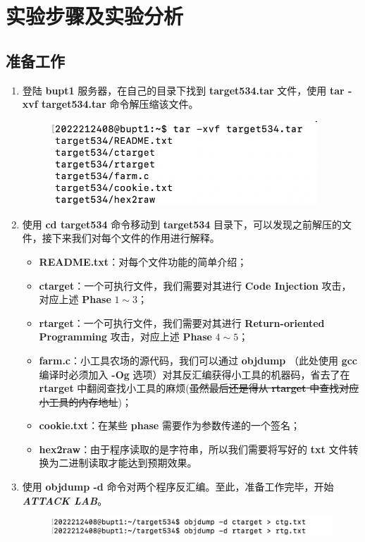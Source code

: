 \section{实验步骤及实验分析}
    \subsection{准备工作}
        \begin{enumerate}
            \item 登陆 \textbf{bupt1} 服务器，在自己的目录下找到 \textbf{target534.tar} 文件，使用 \textbf{tar -xvf target534.tar} 命令解压缩该文件。
                \begin{figure}[htbp]
                    \centering
                    \includegraphics*[width = 10cm]{s0_0.png}
                \end{figure}
            \item 使用 \textbf{cd target534} 命令移动到 \textbf{target534} 目录下，可以发现之前解压的文件，接下来我们对每个文件的作用进行解释。
            \begin{itemize}
                \item \textbf{README.txt}：对每个文件功能的简单介绍；
                \item \textbf{ctarget}：一个可执行文件，我们需要对其进行 \textbf{Code Injection} 攻击，对应上述 \textbf{Phase} $1 \sim 3$；
                \item \textbf{rtarget}：一个可执行文件，我们需要对其进行 \textbf{Return-oriented Programming} 攻击，对应上述 \textbf{Phase} $4 \sim 5$；
                \item \textbf{farm.c}：小工具农场的源代码，我们可以通过 \textbf{objdump} （此处使用 \textbf{gcc} 编译时必须加入 \textbf{-Og} 选项）对其反汇编获得小工具的机器码，省去了在 \textbf{rtarget} 中翻阅查找小工具的麻烦(\sout{虽然最后还是得从 \textbf{rtarget} 中查找对应小工具的内存地址})；
                \item \textbf{cookie.txt}：在某些 \textbf{phase} 需要作为参数传递的一个签名；
                \item \textbf{hex2raw}：由于程序读取的是字符串，所以我们需要将写好的 \textbf{txt} 文件转换为二进制读取才能达到预期效果。
            \end{itemize}
            \item 使用 \textbf{objdump -d} 命令对两个程序反汇编。至此，准备工作完毕，开始 \textbf{\textit{ATTACK LAB}}。
                \begin{figure}[htbp]
                    \centering
                    \includegraphics*[width = 12cm]{s0_1.png}
                \end{figure}
        \end{enumerate}
    

